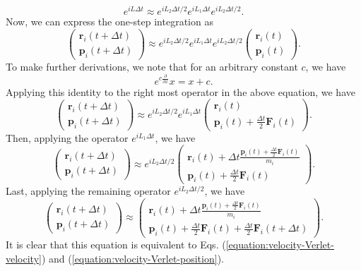 \documentclass[12pt,a4paper]{report}
\newcommand{\vect}[1]{\boldsymbol{#1}}
\begin{document}
\begin{equation}
e^{iL \Delta t} \approx
e^{iL_2 \Delta t/2} e^{iL_1 \Delta t}e^{iL_2 \Delta t/2}.
\end{equation}
Now, we can express the one-step integration as
\begin{equation}
\left(
\begin{array}{c}
\vect{r}_i(t+\Delta t) \\
\vect{p}_i(t+\Delta t)
\end{array}
\right) \approx
e^{iL_2 \Delta t/2} e^{iL_1 \Delta t}e^{iL_2 \Delta t/2}
\left(
\begin{array}{c}
\vect{r}_i(t) \\
\vect{p}_i(t)
\end{array}
\right).
\end{equation}
To make further derivations, we note that for an arbitrary constant $c$, we have
\begin{equation}
e^{c \frac{\partial}{\partial x}} x = x+c.
\end{equation}
Applying this identity to the right most operator in the above equation, we have
\begin{equation}
\left(
\begin{array}{c}
\vect{r}_i(t+\Delta t) \\
\vect{p}_i(t+\Delta t)
\end{array}
\right) \approx
e^{iL_2 \Delta t/2} e^{iL_1 \Delta t}
\left(
\begin{array}{c}
\vect{r}_i(t) \\
\vect{p}_i(t) + \frac{\Delta t}{2} \vect{F}_i(t)
\end{array}
\right).
\end{equation}
Then, applying the operator $e^{iL_1 \Delta t}$, we have
\begin{equation}
\left(
\begin{array}{c}
\vect{r}_i(t+\Delta t) \\
\vect{p}_i(t+\Delta t)
\end{array}
\right) \approx
e^{iL_2 \Delta t/2}
\left(
\begin{array}{c}
\vect{r}_i(t) + \Delta t \frac{\vect{p}_i(t) + \frac{\Delta t}{2} \vect{F}_i(t)}{m_i} \\
\vect{p}_i(t) + \frac{\Delta t}{2} \vect{F}_i(t)
\end{array}
\right).
\end{equation}
Last, applying the remaining operator $e^{iL_2 \Delta t/2}$, we have
\begin{equation}
\left(
\begin{array}{c}
\vect{r}_i(t+\Delta t) \\
\vect{p}_i(t+\Delta t)
\end{array}
\right) \approx
\left(
\begin{array}{c}
\vect{r}_i(t) + \Delta t \frac{\vect{p}_i(t) + \frac{\Delta t}{2} \vect{F}_i(t)}{m_i} \\
\vect{p}_i(t) +
\frac{\Delta t}{2} \vect{F}_i(t) +
\frac{\Delta t}{2} \vect{F}_i(t+\Delta t)
\end{array}
\right).
\end{equation}
It is clear that this equation is equivalent to Eqs. (\ref{equation:velocity-Verlet-velocity}) and (\ref{equation:velocity-Verlet-position}).
\end{document}
